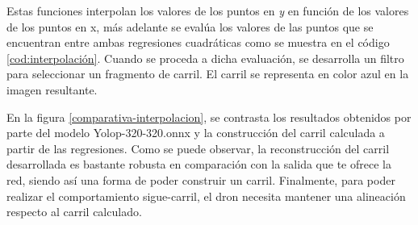 Estas funciones interpolan los valores de los puntos en \textit{y} en función de los valores de los puntos en x, 
más adelante se evalúa los valores de las puntos que se encuentran entre 
ambas regresiones cuadráticas como se muestra en el código \ref{cod:interpolación}. Cuando se proceda a dicha evaluación, se desarrolla un filtro 
para seleccionar un fragmento de carril. El carril se representa en color azul en la imagen resultante.\newline

En la figura \ref{comparativa-interpolacion}, se contrasta los resultados obtenidos por parte del modelo Yolop-320-320.onnx y la construcción del carril calculada a partir de las regresiones. 
Como se puede observar, la reconstrucción del carril desarrollada es bastante robusta en comparación con la salida que te ofrece la red, siendo así una forma de poder construir un 
carril. Finalmente, para poder realizar el comportamiento sigue-carril, el dron necesita mantener una alineación respecto al carril calculado. \newline



